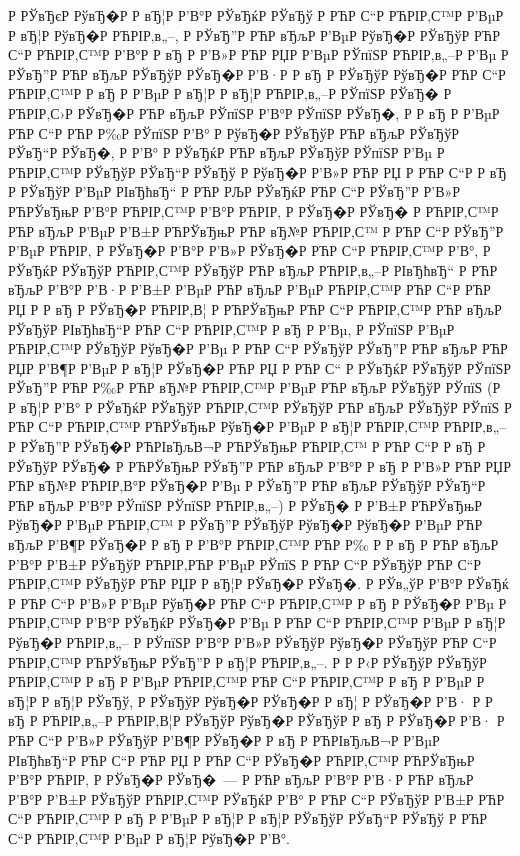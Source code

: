 \documentclass[a4paper,14pt]{extarticle}
\begin{document}
Р  РЎвЂєР  РўвЂ�Р  Р вЂ¦Р  Р’В°Р  РЎвЂќР  РЎвЂў Р РЋР С“Р РЋРІР‚С™Р  Р’ВµР  Р вЂ¦Р  РўвЂ�Р РЋРІР‚в„–, Р  РЎвЂ”Р РЋР вЂљР  Р’ВµР  РўвЂ�Р  РЎвЂўР РЋР С“Р РЋРІР‚С™Р  Р’В°Р  Р вЂ Р  Р’В»Р РЋР РЏР  Р’ВµР  РЎпїЅР РЋРІР‚в„–Р  Р’Вµ Р  РЎвЂ”Р РЋР вЂљР  РЎвЂўР  РЎвЂ�Р  Р’В·Р  Р вЂ Р  РЎвЂўР  РўвЂ�Р РЋР С“Р РЋРІР‚С™Р  Р вЂ Р  Р’ВµР  Р вЂ¦Р  Р вЂ¦Р РЋРІР‚в„–Р  РЎпїЅР  РЎвЂ� Р РЋРІР‚С›Р  РЎвЂ�Р РЋР вЂљР  РЎпїЅР  Р’В°Р  РЎпїЅР  РЎвЂ�, Р  Р вЂ Р  Р’ВµР РЋР С“Р РЋР Р‰Р  РЎпїЅР  Р’В° Р  РўвЂ�Р  РЎвЂўР РЋР вЂљР  РЎвЂўР  РЎвЂ“Р  РЎвЂ�, Р  Р’В° Р  РЎвЂќР РЋР вЂљР  РЎвЂўР  РЎпїЅР  Р’Вµ Р РЋРІР‚С™Р  РЎвЂўР  РЎвЂ“Р  РЎвЂў Р  РўвЂ�Р  Р’В»Р РЋР РЏ Р РЋР С“Р  Р вЂ Р  РЎвЂўР  Р’ВµР  РІвЂћвЂ“ Р РЋР РЉР  РЎвЂќР РЋР С“Р  РЎвЂ”Р  Р’В»Р РЋРЎвЂњР  Р’В°Р РЋРІР‚С™Р  Р’В°Р РЋРІР‚ Р  РЎвЂ�Р  РЎвЂ� Р РЋРІР‚С™Р РЋР вЂљР  Р’ВµР  Р’В±Р РЋРЎвЂњР РЋР вЂ№Р РЋРІР‚С™ Р РЋР С“Р  РЎвЂ”Р  Р’ВµР РЋРІР‚ Р  РЎвЂ�Р  Р’В°Р  Р’В»Р  РЎвЂ�Р РЋР С“Р РЋРІР‚С™Р  Р’В°, Р  РЎвЂќР  РЎвЂўР РЋРІР‚С™Р  РЎвЂўР РЋР вЂљР РЋРІР‚в„–Р  РІвЂћвЂ“ Р РЋР вЂљР  Р’В°Р  Р’В·Р  Р’В±Р  Р’ВµР РЋР вЂљР  Р’ВµР РЋРІР‚С™Р РЋР С“Р РЋР РЏ Р  Р вЂ  Р  РЎвЂ�Р РЋРІР‚В¦ Р РЋРЎвЂњР РЋР С“Р РЋРІР‚С™Р РЋР вЂљР  РЎвЂўР  РІвЂћвЂ“Р РЋР С“Р РЋРІР‚С™Р  Р вЂ Р  Р’Вµ, Р  РЎпїЅР  Р’ВµР РЋРІР‚С™Р  РЎвЂўР  РўвЂ�Р  Р’Вµ Р РЋР С“Р  РЎвЂўР  РЎвЂ”Р РЋР вЂљР РЋР РЏР  Р’В¶Р  Р’ВµР  Р вЂ¦Р  РЎвЂ�Р РЋР РЏ Р РЋР С“ Р  РЎвЂќР  РЎвЂўР  РЎпїЅР  РЎвЂ”Р РЋР Р‰Р РЋР вЂ№Р РЋРІР‚С™Р  Р’ВµР РЋР вЂљР  РЎвЂўР  РЎпїЅ (Р  Р вЂ¦Р  Р’В° Р  РЎвЂќР  РЎвЂўР РЋРІР‚С™Р  РЎвЂўР РЋР вЂљР  РЎвЂўР  РЎпїЅ Р РЋР С“Р РЋРІР‚С™Р РЋРЎвЂњР  РўвЂ�Р  Р’ВµР  Р вЂ¦Р РЋРІР‚С™Р РЋРІР‚в„– Р  РЎвЂ”Р  РЎвЂ�Р РЋРІвЂљВ¬Р РЋРЎвЂњР РЋРІР‚С™ Р РЋР С“Р  Р вЂ Р  РЎвЂўР  РЎвЂ� Р РЋРЎвЂњР  РЎвЂ”Р РЋР вЂљР  Р’В°Р  Р вЂ Р  Р’В»Р РЋР РЏР РЋР вЂ№Р РЋРІР‚В°Р  РЎвЂ�Р  Р’Вµ Р  РЎвЂ”Р РЋР вЂљР  РЎвЂўР  РЎвЂ“Р РЋР вЂљР  Р’В°Р  РЎпїЅР  РЎпїЅР РЋРІР‚в„–) Р  РЎвЂ� Р  Р’В±Р РЋРЎвЂњР  РўвЂ�Р  Р’ВµР РЋРІР‚С™ Р  РЎвЂ”Р  РЎвЂўР  РўвЂ�Р  РўвЂ�Р  Р’ВµР РЋР вЂљР  Р’В¶Р  РЎвЂ�Р  Р вЂ Р  Р’В°Р РЋРІР‚С™Р РЋР Р‰ Р  Р вЂ  Р РЋР вЂљР  Р’В°Р  Р’В±Р  РЎвЂўР РЋРІР‚РЋР  Р’ВµР  РЎпїЅ Р РЋР С“Р  РЎвЂўР РЋР С“Р РЋРІР‚С™Р  РЎвЂўР РЋР РЏР  Р вЂ¦Р  РЎвЂ�Р  РЎвЂ�. Р  РЎв„ўР  Р’В°Р  РЎвЂќ Р РЋР С“Р  Р’В»Р  Р’ВµР  РўвЂ�Р РЋР С“Р РЋРІР‚С™Р  Р вЂ Р  РЎвЂ�Р  Р’Вµ Р РЋРІР‚С™Р  Р’В°Р  РЎвЂќР  РЎвЂ�Р  Р’Вµ Р РЋР С“Р РЋРІР‚С™Р  Р’ВµР  Р вЂ¦Р  РўвЂ�Р РЋРІР‚в„– Р  РЎпїЅР  Р’В°Р  Р’В»Р  РЎвЂўР  РўвЂ�Р  РЎвЂўР РЋР С“Р РЋРІР‚С™Р РЋРЎвЂњР  РЎвЂ”Р  Р вЂ¦Р РЋРІР‚в„–. Р  Р Р‹Р  РЎвЂўР  РЎвЂўР РЋРІР‚С™Р  Р вЂ Р  Р’ВµР РЋРІР‚С™Р РЋР С“Р РЋРІР‚С™Р  Р вЂ Р  Р’ВµР  Р вЂ¦Р  Р вЂ¦Р  РЎвЂў, Р  РЎвЂўР  РўвЂ�Р  РЎвЂ�Р  Р вЂ¦ Р  РЎвЂ�Р  Р’В· Р  Р вЂ Р РЋРІР‚в„–Р РЋРІР‚В¦Р  РЎвЂўР  РўвЂ�Р  РЎвЂўР  Р вЂ  Р  РЎвЂ�Р  Р’В· Р РЋР С“Р  Р’В»Р  РЎвЂўР  Р’В¶Р  РЎвЂ�Р  Р вЂ Р РЋРІвЂљВ¬Р  Р’ВµР  РІвЂћвЂ“Р РЋР С“Р РЋР РЏ Р РЋР С“Р  РЎвЂ�Р РЋРІР‚С™Р РЋРЎвЂњР  Р’В°Р РЋРІР‚ Р  РЎвЂ�Р  РЎвЂ�~--- Р РЋР вЂљР  Р’В°Р  Р’В·Р РЋР вЂљР  Р’В°Р  Р’В±Р  РЎвЂўР РЋРІР‚С™Р  РЎвЂќР  Р’В° Р РЋР С“Р  РЎвЂўР  Р’В±Р РЋР С“Р РЋРІР‚С™Р  Р вЂ Р  Р’ВµР  Р вЂ¦Р  Р вЂ¦Р  РЎвЂўР  РЎвЂ“Р  РЎвЂў Р РЋР С“Р РЋРІР‚С™Р  Р’ВµР  Р вЂ¦Р  РўвЂ�Р  Р’В°.
\end{document}
